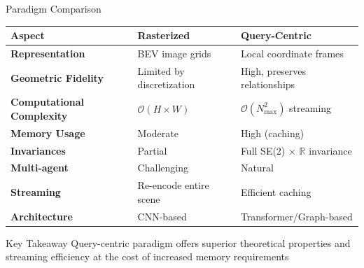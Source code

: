 \documentclass[10pt,aspectratio=169]{beamer}
\begin{document}
\begin{frame}{Paradigm Comparison}
\begin{table}[ht]
\centering
\footnotesize
\begin{tabular}{|p{2.5cm}|p{4cm}|p{4cm}|}
\hline
\textbf{Aspect} & \textbf{Rasterized} & \textbf{Query-Centric} \\
\hline
\textbf{Representation} & BEV image grids & Local coordinate frames \\
\hline
\textbf{Geometric Fidelity} & Limited by discretization & High, preserves relationships \\
\hline
\textbf{Computational Complexity} & $\mathcal{O}(H \times W)$ & $\mathcal{O}(N_{\max}^2)$ streaming \\
\hline
\textbf{Memory Usage} & Moderate & High (caching) \\
\hline
\textbf{Invariances} & Partial & Full SE(2) × $\mathbb{R}$ invariance \\
\hline
\textbf{Multi-agent} & Challenging & Natural \\
\hline
\textbf{Streaming} & Re-encode entire scene & Efficient caching \\
\hline
\textbf{Architecture} & CNN-based & Transformer/Graph-based \\
\hline
\end{tabular}
\end{table}

\begin{block}{Key Takeaway}
Query-centric paradigm offers superior theoretical properties and streaming efficiency at the cost of increased memory requirements
\end{block}
\end{frame}
\end{document}

